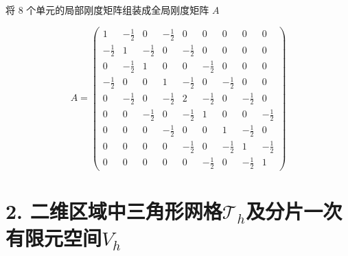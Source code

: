 \documentclass[a4paper]{article}
\begin{document}
将 8 个单元的局部刚度矩阵组装成全局刚度矩阵 $A$

\begin{equation}
    A =
    \begin{pmatrix}
        1 & -\frac{1}{2} & 0 & -\frac{1}{2} & 0 & 0 & 0 & 0 & 0\\
        -\frac{1}{2} & 1 & -\frac{1}{2} & 0 & -\frac{1}{2} & 0 & 0 & 0 & 0\\
        0 & -\frac{1}{2} & 1 & 0 & 0 & -\frac{1}{2} & 0 & 0 & 0\\
        -\frac{1}{2} & 0 & 0 & 1 & -\frac{1}{2} & 0 & -\frac{1}{2} & 0 & 0\\
        0 & -\frac{1}{2} & 0 & -\frac{1}{2} & 2 & -\frac{1}{2} & 0 & -\frac{1}{2} & 0\\
        0 & 0 & -\frac{1}{2} & 0 & -\frac{1}{2} & 1 & 0 & 0 & -\frac{1}{2}\\
        0 & 0 & 0 & -\frac{1}{2} & 0 & 0 & 1 & -\frac{1}{2} & 0\\
        0 & 0 & 0 & 0 & -\frac{1}{2} & 0 & -\frac{1}{2} & 1& -\frac{1}{2}\\
        0& 0& 0& 0& 0& -\frac{1}{2}& 0& -\frac{1}{2}& 1
    \end{pmatrix}
\end{equation}

\section*{2. 二维区域中三角形网格$\mathcal{T}_h$及分片一次有限元空间$V_h$}
\end{document}
